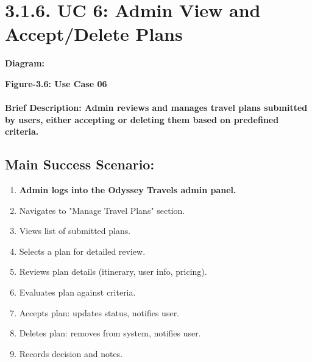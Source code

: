 \documentclass{scrreprt}
\begin{document}
\section*{\textbf{3.1.6. UC 6: Admin View and Accept/Delete Plans}}
\textbf{Diagram:}
\newline
\newline

\begin{center}
    \parbox{0.8\textwidth}{ 
        \centering
       
    }
\end{center}
\begin{center}
    \parbox{0.8\textwidth}{ 
        \centering
        \textbf{Figure-3.6: Use Case 06}
    }
\end{center}

\paragraph {\textnormal{Brief Description: 
Admin reviews and manages travel plans submitted by users, either accepting or deleting them based on predefined criteria.}}


\subsection*{\textbf{Main Success Scenario:}}

\begin{enumerate}
    \item \textbf{Admin logs into the Odyssey Travels admin panel.}
    \item Navigates to "Manage Travel Plans" section.
    \item Views list of submitted plans.
    \item Selects a plan for detailed review.
    \item Reviews plan details (itinerary, user info, pricing).
    \item Evaluates plan against criteria.
    \item Accepts plan: updates status, notifies user.
    \item Deletes plan: removes from system, notifies user.
    \item Records decision and notes.
\end{enumerate}
\end{document}
